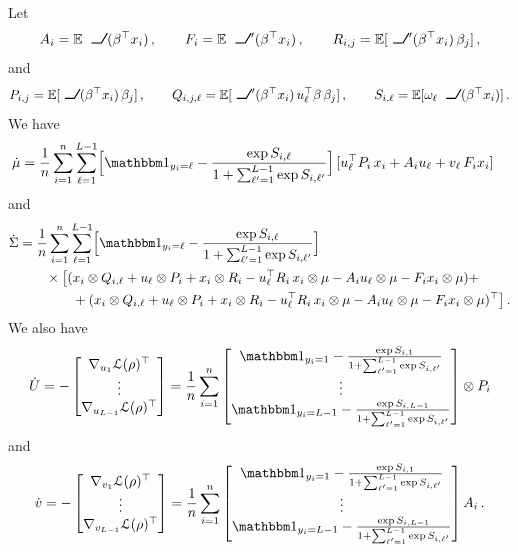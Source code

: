 \documentclass{custom}
\begin{document}
Let
\[
A_{i}=\mathbb{E}\ReLU(\beta^\top x_i)\,,\qquad F_{i}=\mathbb{E}\ReLU'(\beta^\top x_i)\,,\qquad R_{i,j}=\mathbb{E}[\ReLU'(\beta^\top x_i)\,\beta_{j}]\,,
\]
and
\[
P_{i,j}=\mathbb{E}[\ReLU(\beta^\top x_i)\,\beta_{j}]\,,\qquad Q_{i,j,\ell}=\mathbb{E}[\ReLU'(\beta^\top x_i)\,u_{\ell}^{\top}\beta\,\beta_{j}]\,,\qquad S_{i,\ell} = \mathbb{E}[\omega_{\ell}\ReLU(\beta^\top x_i)]\,.
\]
We have
\begin{align*}
\dot{\mu}
& =\frac{1}{n}\sum_{i=1}^{n}\sum_{\ell=1}^{L-1}\Bigl[\ind_{y_{i}=\ell}-\frac{\exp S_{i,\ell}}{1+\sum_{\ell'=1}^{L-1}\exp S_{i,\ell'}}\Bigr]\,[u_{\ell}^{\top}P_{i} \,x_{i}+A_{i}u_{\ell}+v_{\ell}\,F_{i}x_{i}]
\end{align*}
and
\begin{align*}
\dot{\Sigma}
& =\frac{1}{n}\sum_{i=1}^{n}\sum_{\ell=1}^{L-1}\Bigl[\ind_{y_{i}=\ell}-\frac{\exp S_{i,\ell}}{1+\sum_{\ell'=1}^{L-1}\exp S_{i,\ell'}}\Bigr] \\
&\qquad{}\times \big[(x_{i}\otimes Q_{i,\ell}+u_{\ell}\otimes P_{i}+x_{i}\otimes R_{i}- u_{\ell}^{\top}R_{i}\,x_{i}\otimes\mu-A_{i}u_{\ell}\otimes\mu-F_{i}x_{i}\otimes\mu)+ \\
& \qquad\qquad + (x_{i}\otimes Q_{i,\ell}+u_{\ell}\otimes P_{i}+x_{i}\otimes R_{i}- u_{\ell}^{\top}R_{i}\,x_{i}\otimes\mu-A_{i}u_{\ell}\otimes\mu-F_{i}x_{i}\otimes\mu)^\top \big]\,.
\end{align*}
We also have
\[
\dot{U}
=-\begin{bmatrix}
\nabla_{u_{1}}\loss(\rho)^{\top}\\
\vdots\\
\nabla_{u_{L-1}}\loss(\rho)^{\top}
\end{bmatrix}
=\frac{1}{n}\sum_{i=1}^{n}\begin{bmatrix}
\ind_{y_{i}=1}-\frac{\exp S_{i,1} }{1+\sum_{\ell'=1}^{L-1}\exp S_{i,\ell'}}\\
\vdots\\
\ind_{y_{i}=L-1}-\frac{\exp S_{i,L-1}}{1+\sum_{\ell'=1}^{L-1}\exp S_{i,\ell'}}
\end{bmatrix}\otimes P_{i}
\]
and
\[
\dot{v}
=-\begin{bmatrix}
\nabla_{v_{1}}\loss(\rho)^{\top}\\
\vdots\\
\nabla_{v_{L-1}}\loss(\rho)^{\top}
\end{bmatrix}=\frac{1}{n}\sum_{i=1}^{n}\begin{bmatrix}
\ind_{y_{i}=1}-\frac{\exp S_{i,1}}{1+\sum_{\ell'=1}^{L-1}\exp S_{i,\ell'}}\\
\vdots\\
\ind_{y_{i}=L-1}-\frac{\exp S_{i,L-1}}{1+\sum_{\ell'=1}^{L-1}\exp S_{i,\ell'}}
\end{bmatrix}A_{i}\,.
\]
\end{document}
